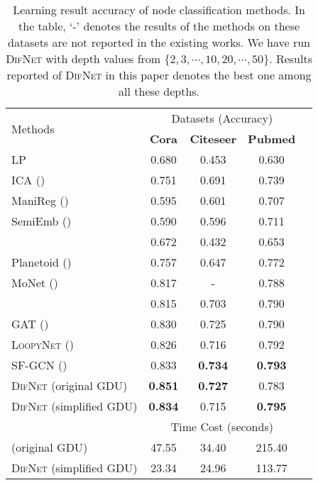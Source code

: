 \documentclass{article}
\newcommand{\our}{\textsc{DifNet}}
\newcommand{\gdu}{\textsc{GDU}}
\newcommand{\loopy}{\textsc{LoopyNet}}
\newcommand{\gcn}{\textsc{GCN}}
\newcommand{\gat}{\textsc{GAT}}
\begin{document}
\begin{table}[t]
\caption{Learning result accuracy of node classification methods. In the table, `-' denotes the results of the methods on these datasets are not reported in the existing works. We have run {\our} with depth values from $\{2, 3, \cdots, 10, 20, \cdots, 50\}$. Results reported of {\our} in this paper denotes the best one among all these depths.}\label{tab:complete_performance_comparison}
\centering
\small
\setlength{\tabcolsep}{4pt}
\begin{tabular}{l c c c c }
\toprule
 \multirow{2}{*}{Methods}  & \multicolumn{3}{c}{Datasets (Accuracy)} \\
\cline{2-4}
\addlinespace[0.05cm]
& \textbf{Cora} & \textbf{Citeseer} & \textbf{Pubmed} \\
\hline
\addlinespace[0.05cm]

{LP } &0.680 &0.453 &0.630  \\
{ICA (\cite{LG03})} &0.751  &0.691  &0.739   \\
{ManiReg (\cite{BNS06})} &0.595  &0.601  &0.707   \\
{SemiEmb (\cite{WRC08})} &0.590  &0.596  &0.711  \\
\hline
\addlinespace[0.05cm]
{DeepWalk (\cite{PAS14})} &0.672  &0.432  &0.653   \\
{Planetoid (\cite{YCS16})} &0.757  &0.647  &0.772  \\
{MoNet (\cite{MBMRSB16})} &0.817  &-  &0.788  \\
\hline
\addlinespace[0.05cm]
{{\gcn} (\cite{Kipf_Semi_CORR_16})} &0.815  &0.703  &0.790   \\
{{\gat} (\cite{Velickovic_Graph_ICLR_18})} &0.830  &0.725  &0.790  \\
{{\loopy} (\cite{loopynet})} &0.826  &0.716  &0.792  \\
{SF-GCN (\cite{DBLP:journals/corr/abs-1907-02586})} &0.833  &\textbf{0.734}  &\textbf{0.793}   \\
\hline
\addlinespace[0.05cm]

{\our} (original {\gdu}) &\textbf{0.851}  &\textbf{0.727}  &{0.783}  \\
{\our} (simplified {\gdu}) &\textbf{0.834}  &{0.715}  &\textbf{0.795}  \\

\bottomrule
\toprule
\addlinespace[0.1cm]
& \multicolumn{3}{c}{Time Cost (seconds)} \\
\cline{2-4}
\addlinespace[0.05cm]
{\our} (original {\gdu}) &47.55  &34.40  &215.40 \\
{\our} (simplified {\gdu}) &23.34  &24.96  &113.77 \\
\bottomrule
\end{tabular} \vspace{-10pt}
\end{table}
\end{document}
